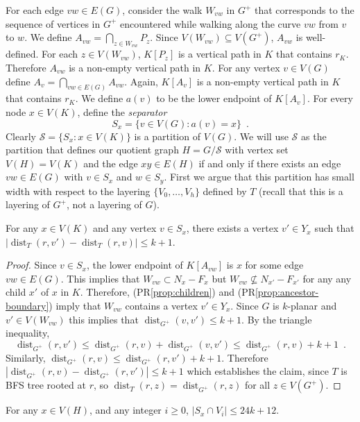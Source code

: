 \documentclass{patmorin}
\DeclareMathOperator{\dist}{dist}
\renewcommand{\propref}[1]{(PR\ref{prop:#1})}
\begin{document}
For each edge $vw\in E(G)$, consider the walk $W_{vw}$ in $G^+$ that corresponds to the sequence of vertices in $G^+$ encountered while walking along the curve $vw$ from $v$ to $w$. We define $A_{vw}=\bigcap_{z\in W_{vw}} P_z$.  Since $V(W_{vw})\subseteq V(G^+)$, $A_{vw}$ is well-defined.  For each $z\in V(W_{vw})$, $K[P_{z}]$ is a vertical path in $K$ that contains $r_K$.   Therefore $A_{vw}$ is a non-empty vertical path in $K$.  For any vertex $v\in V(G)$ define $A_v=\bigcap_{vw\in E(G)} A_{vw}$.  Again, $K[A_v]$ is a non-empty vertical path in $K$ that contains $r_K$.  We define $a(v)$ to be the lower endpoint of $K[A_v]$.  For every node $x\in V(K)$, define the \emph{separator}
\[
   S_x = \{v\in V(G): a(v)=x \} \enspace .
\]
Clearly $\mathcal{S}=\{S_x:x\in V(K)\}$ is a partition of $V(G)$.  We will use $\mathcal{S}$ as the partition that defines our quotient graph $H=G/\mathcal{S}$ with vertex set $V(H)=V(K)$ and the edge $xy\in E(H)$ if and only if there exists an edge $vw\in E(G)$ with $v\in S_x$ and $w\in S_y$.  First we argue that this partition has small width with respect to the layering $\{V_0,\ldots,V_h\}$ defined by $T$ (recall that this is a layering of $G^+$, not a layering of $G$).

\begin{clm}
   For any $x\in V(K)$ and any vertex $v\in S_x$, there exists a vertex $v'\in Y_x$ such that $|\dist_T(r,v')-\dist_T(r,v)|\le k+1$.  
\end{clm}

\begin{proof}
  Since $v\in S_x$, the lower endpoint of $K[A_{vw}]$ is $x$ for some edge $vw\in E(G)$.  This implies that $W_{vw}\subset N_x-F_x$ but $W_{vw} \not\subseteq N_{x'}-F_{x'}$ for any any child $x'$ of $x$ in $K$. Therefore, \propref{children} and \propref{ancestor-boundary} imply that $W_{vw}$ contains a vertex $v'\in Y_x$.  Since $G$ is $k$-planar and $v'\in V(W_{vw})$ this implies that $\dist_{G^+}(v,v') \le k+1$.
  By the triangle inequality,     
  \[
    \dist_{G^+}(r,v') \le \dist_{G^+}(r,v) + \dist_{G^+}(v,v') 
       \le \dist_{G^+}(r,v) + k + 1 \enspace .
  \]
  Similarly, $\dist_{G^+}(r,v) \le \dist_{G^+}(r, v') + k+1$.  Therefore
  $|\dist_{G^+}(r,v)-\dist_{G^+}(r,v')| \le k+1$ which establishes the claim, since $T$ is BFS tree rooted at $r$, so $\dist_{T}(r,z)=\dist_{G^+}(r,z)$ for all $z\in V(G^+)$.
\end{proof}

\begin{clm}
  For any $x\in V(H)$, and any integer $i\ge 0$, $|S_x\cap V_i|\le 24k+12$.
\end{clm}
\end{document}
